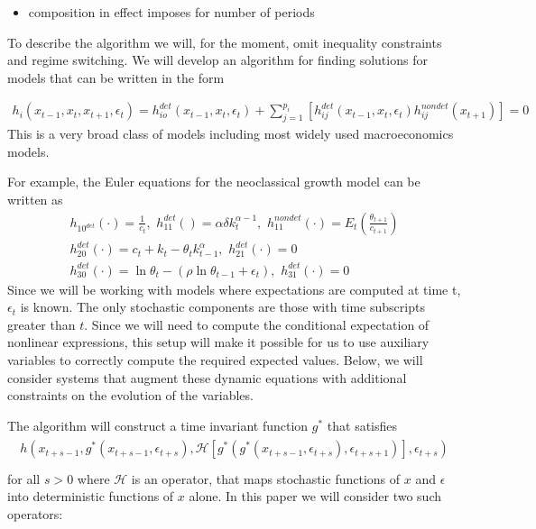 \documentclass[12pt]{article}
\begin{document}
\begin{itemize}
\item composition in effect imposes for number of periods
\end{itemize}



To describe the algorithm we will, for the moment, omit inequality constraints
and regime switching.
We will develop an algorithm for finding solutions for models that can be written in  the form


\begin{gather}
  h_i(x_{t-1},x_{t},x_{t+1},\epsilon_t)=h^{det}_{io}(x_{t-1},x_{t},\epsilon_t)+\sum_{j=1}^{p_i} [h^{det}_{ij}(x_{t-1},x_{t},\epsilon_t)h^{nondet}_{ij}(x_{t+1})]=0
\end{gather}
This is a very broad class of models including most widely used
macroeconomics models.

For example, the Euler equations for the  neoclassical growth  model 
\label{sec:simple-rbc-model-ext} can be written as
\begin{gather}
h_{10^{det}}(\cdot)=\frac{1}{c_t},\,\,
h_{11}^{det}()=\alpha \delta k_{t}^{\alpha-1} ,\,\,
h_{11}^{nondet}(\cdot)=E_t \left (\frac{\theta_{t+1}}{c_{t+1}} \right )\\
h_{20}^{det}(\cdot)=c_t + k_t-\theta_tk_{t-1}^\alpha,\,\,
h_{21}^{det}(\cdot)=0\\
h_{30}^{det}(\cdot)=\ln \theta_t -(\rho \ln \theta_{t-1} + \epsilon_t),\,\,
h_{31}^{det}(\cdot)=0
\end{gather}
Since we will be working with models where expectations are computed at time t, $\epsilon_t$ is known.  The only stochastic components are those with time subscripts greater than $t$. Since we will need to compute 
the conditional expectation of nonlinear expressions,  
this setup will make it possible for us to use auxiliary
variables to correctly compute the required expected values.
Below, we will consider 
systems that augment these dynamic equations with additional constraints 
on the evolution of the variables.


The algorithm will construct
 a time invariant function $g^\ast$ that satisfies
\begin{gather}
  \begin{split}
h(x_{t+s-1},g^\ast(x_{t+s-1},\epsilon_{t+s}),\mathcal{H}[g^\ast(g^\ast(x_{t+s-1},\epsilon_{t+s}),\epsilon_{t+s+1})],\epsilon_{t+s}) \label{theProblem} \\
  \end{split}
 \end{gather}
 for all $s>0$ where $\mathcal{H}$ is an operator, 
  that maps stochastic functions of $x$ and $\epsilon$ into deterministic 
functions of $x$ alone.  In this paper we will consider two such operators:
\end{document}
